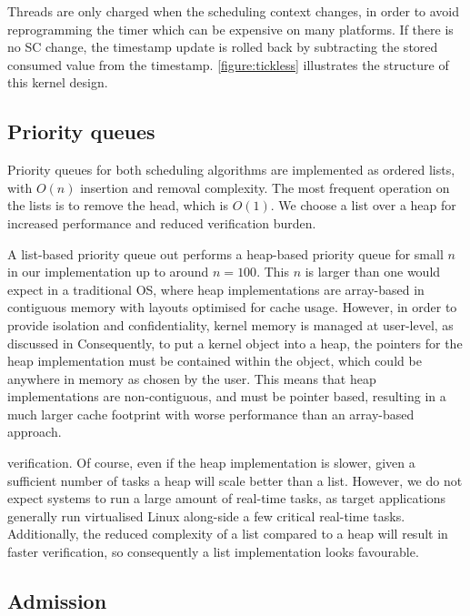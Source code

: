 Threads are only charged when the scheduling context changes, in order to avoid
reprogramming the timer which can be expensive on many platforms. %
If there is no SC change, the timestamp update is rolled back by subtracting the
stored consumed value from the timestamp.
\autoref{figure:tickless} illustrates the structure of this kernel design.

\subsection{Priority queues}

Priority queues for both scheduling algorithms are implemented as ordered lists, with $O(n)$ insertion and removal complexity.
The most frequent operation on the lists is to remove the head, which is $O(1)$.
We choose a list over a heap for increased performance and reduced verification burden.

A list-based priority queue out performs a heap-based priority queue for small $n$ in our implementation up to around $n = 100$.
This $n$ is larger than one would expect in a traditional \gls{OS}, where heap implementations are array-based in contiguous memory with layouts optimised for cache usage.
However, in order to provide isolation and confidentiality, \selfour kernel memory is managed at user-level, as discussed in %
Consequently, to put a \selfour kernel object into a heap, the pointers for the heap implementation must be contained within the object, which could be anywhere in memory as chosen by the user.
This means that \selfour heap implementations are non-contiguous, and must be pointer based, resulting in a much larger cache footprint with worse performance than an array-based approach.

verification.
Of course, even if the heap implementation is slower, given a sufficient number of tasks a heap will scale better than a list.
However, we do not expect systems to run a large amount of real-time tasks, as \selfour target applications generally run virtualised Linux along-side a few critical real-time tasks.
Additionally, the reduced complexity of a list compared to a heap will result in faster verification, so consequently a list implementation looks favourable.

\subsection{Admission}

